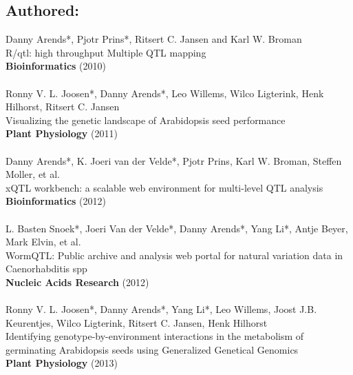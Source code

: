 \documentclass[8pt, twoside, a5paper]{report}
\newcommand{\authors}[1]{\small{#1}}
\newcommand{\bold}[1]{{\bfseries #1}}
\begin{document}
\subsection*{Authored:}
  \authors{Danny Arends*, Pjotr Prins*, Ritsert C. Jansen and Karl W. Broman}\\
  R/qtl: high throughput Multiple QTL mapping\\
  \bold{Bioinformatics} (2010)\\\\
  \authors{Ronny V. L. Joosen*, Danny Arends*, Leo Willems, Wilco Ligterink, Henk Hilhorst, Ritsert C. Jansen}\\
  Visualizing the genetic landscape of Arabidopsis seed performance\\
  \bold{Plant Physiology} (2011)\\\\
  \authors{Danny Arends*, K. Joeri van der Velde*, Pjotr Prins, Karl W. Broman, Steffen Moller, et al.}\\
  xQTL workbench: a scalable web environment for multi-level QTL analysis\\
  \bold{Bioinformatics} (2012)\\\\
  \authors{L. Basten Snoek*, Joeri Van der Velde*, Danny Arends*, Yang Li*, Antje Beyer, Mark Elvin, et al.}\\
  WormQTL: Public archive and analysis web portal for natural variation data in Caenorhabditis spp\\
  \bold{Nucleic Acids Research} (2012)\\\\
  \authors{Ronny V. L. Joosen*, Danny Arends*, Yang Li*, Leo Willems, Joost J.B. Keurentjes, Wilco Ligterink, Ritsert C. Jansen, Henk Hilhorst}\\
  Identifying genotype-by-environment interactions in the metabolism of germinating Arabidopsis seeds using Generalized Genetical Genomics\\
  \bold{Plant Physiology} (2013)
\end{document}
